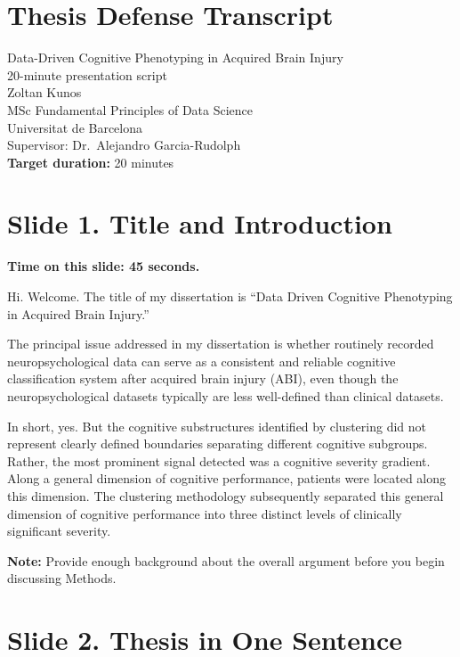 \documentclass[
  11pt,
]{article}
\author{}
\date{}
\begin{document}
\section{Thesis Defense Transcript}\label{thesis-defense-transcript}

Data-Driven Cognitive Phenotyping in Acquired Brain Injury\\
20-minute presentation script\\
Zoltan Kunos\\
MSc Fundamental Principles of Data Science\\
Universitat de Barcelona\\
Supervisor: Dr.~Alejandro Garcia-Rudolph\\
\textbf{Target duration:} 20 minutes

\section{Slide 1. Title and
Introduction}\label{slide-1.-title-and-introduction}

\textbf{Time on this slide: 45 seconds.}

Hi. Welcome. The title of my dissertation is ``Data Driven Cognitive
Phenotyping in Acquired Brain Injury.''

The principal issue addressed in my dissertation is whether routinely
recorded neuropsychological data can serve as a consistent and reliable
cognitive classification system after acquired brain injury (ABI), even
though the neuropsychological datasets typically are less well-defined
than clinical datasets.

In short, yes. But the cognitive substructures identified by clustering
did not represent clearly defined boundaries separating different
cognitive subgroups. Rather, the most prominent signal detected was a
cognitive severity gradient. Along a general dimension of cognitive
performance, patients were located along this dimension. The clustering
methodology subsequently separated this general dimension of cognitive
performance into three distinct levels of clinically significant
severity.

\textbf{Note:} Provide enough background about the overall argument
before you begin discussing Methods.

\section{Slide 2. Thesis in One
Sentence}\label{slide-2.-thesis-in-one-sentence}
\end{document}
